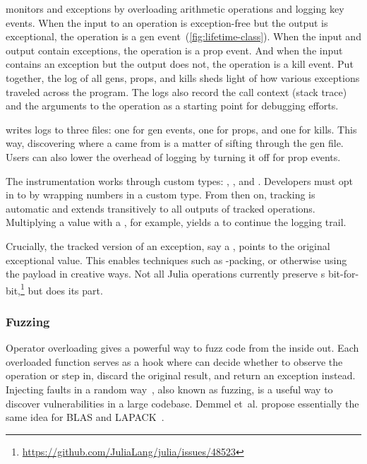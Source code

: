 \documentclass{juliacon}
\begin{document}
\FT{} monitors \Nan{} and \Inf{} exceptions by overloading arithmetic
operations and logging key events.
When the input to an operation is exception-free but the output is
exceptional, the operation is a {gen} event~(\cref{fig:lifetime-class}).
When the input and output contain exceptions, the operation is a {prop}
event.
And when the input contains an exception but the output does not,
the operation is a {kill} event.
Put together, the log of all {gen}s, {prop}s, and {kill}s
sheds light of how various exceptions traveled across the program.
The logs also record the call context (stack trace) and the arguments to the operation as a starting point for debugging efforts.

\FT{} writes logs to three files: one for {gen} events, one for {prop}s, and one for {kill}s.
This way, discovering where a \Nan{} came from is a matter of sifting through the {gen} file.
Users can also lower the overhead of logging by turning it off for prop events.

The instrumentation works through custom \fp{} types: ,
, and .
Developers must opt in to \FT{} by wrapping numbers in a custom type.
From then on, tracking is automatic and extends transitively to all outputs
of tracked operations.
Multiplying a  value with a , for example, yields
a  to continue the logging trail.

Crucially, the tracked version of an exception, say a \NaN{}, points
to the original exceptional value.
This enables techniques such as \NaN{}-packing, or otherwise
using the payload in creative ways.
Not all Julia operations currently preserve \NaN{}s
bit-for-bit,\footnote{\url{https://github.com/JuliaLang/julia/issues/48523}}
but \FT{} does its part.


\subsubsection{Fuzzing}

Operator overloading gives \FT{} a powerful way to fuzz code from the inside out.
Each overloaded function serves as a hook where \FT{} can decide whether to observe
the operation or step in, discard the original result, and return an exception instead.
Injecting faults in a random way~\cite{hamlet1994random}, also known as fuzzing,
is a useful way to discover vulnerabilities in a large codebase.
Demmel et~al. propose essentially the same idea for BLAS and
LAPACK~\cite{ddghlllprr-correctness-2022}.
\end{document}
